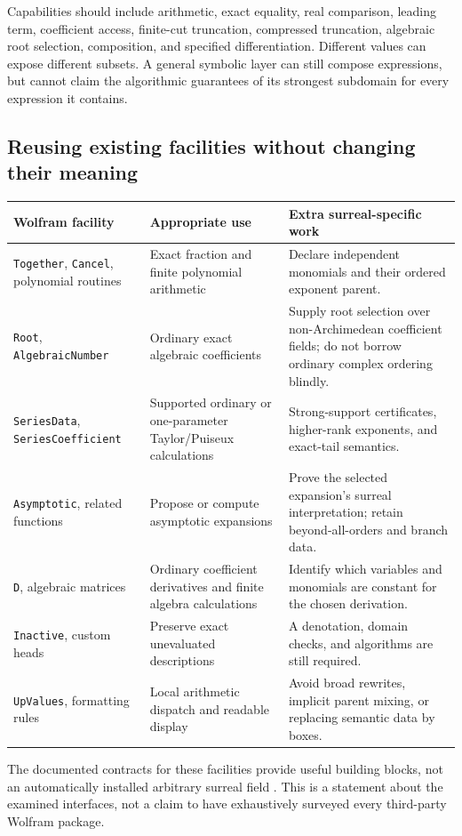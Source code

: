 \documentclass[11pt,letterpaper]{article}
\theoremstyle{definition}\newtheorem{definition}[theorem]{Definition}
\theoremstyle{remark}\newtheorem{remark}[theorem]{Remark}
\newcommand{\code}[1]{\texttt{#1}}
\numberwithin{equation}{section}\setcounter{tocdepth}{2}
\begin{document}
Capabilities should include arithmetic, exact equality, real comparison, leading term, coefficient access, finite-cut truncation, compressed truncation, algebraic root selection, composition, and specified differentiation. Different values can expose different subsets. A general symbolic layer can still compose expressions, but cannot claim the algorithmic guarantees of its strongest subdomain for every expression it contains.

\subsection{Reusing existing facilities without changing their meaning}
\begin{center}\small
\begin{longtable}{@{}L{0.23\textwidth}L{0.33\textwidth}L{0.35\textwidth}@{}}
\toprule Wolfram facility & Appropriate use & Extra surreal-specific work\\\midrule\endhead
\code{Together}, \code{Cancel}, polynomial routines & Exact fraction and finite polynomial arithmetic & Declare independent monomials and their ordered exponent parent.\\[0.35em]
\code{Root}, \code{AlgebraicNumber} & Ordinary exact algebraic coefficients & Supply root selection over non-Archimedean coefficient fields; do not borrow ordinary complex ordering blindly.\\[0.35em]
\code{SeriesData}, \code{SeriesCoefficient} & Supported ordinary or one-parameter Taylor/Puiseux calculations & Strong-support certificates, higher-rank exponents, and exact-tail semantics.\\[0.35em]
\code{Asymptotic}, related functions & Propose or compute asymptotic expansions & Prove the selected expansion's surreal interpretation; retain beyond-all-orders and branch data.\\[0.35em]
\code{D}, algebraic matrices & Ordinary coefficient derivatives and finite algebra calculations & Identify which variables and monomials are constant for the chosen derivation.\\[0.35em]
\code{Inactive}, custom heads & Preserve exact unevaluated descriptions & A denotation, domain checks, and algorithms are still required.\\[0.35em]
\code{UpValues}, formatting rules & Local arithmetic dispatch and readable display & Avoid broad rewrites, implicit parent mixing, or replacing semantic data by boxes.\\
\bottomrule
\end{longtable}\end{center}
The documented contracts for these facilities provide useful building blocks, not an automatically installed arbitrary surreal field \cite{WLRoot,WLAlgebraic,WLSeries,WLAsymptotic,WLInactive,WLUpValues}. This is a statement about the examined interfaces, not a claim to have exhaustively surveyed every third-party Wolfram package.
\end{document}
